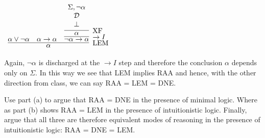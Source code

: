 \documentclass[11pt]{report}
\begin{document}
\begin{enumerate}
\begin{itemize}
		\begin{center}
			$\begin{array}{c}
				\infer[\LEM]{\alpha}
					{\alpha \lor \lnot \alpha
					&
					\alpha \to \alpha
					&
					\infer[\to I]{\lnot \alpha \to \alpha}
						{\infer[\XF]{\alpha}
							{\begin{array}{c} \Sigma, \lnot \alpha  \\ \mathcal{D} \\ \bot \end{array}}}}
			\end{array}$
		\end{center}

		Again, $\lnot \alpha$ is discharged at the $\to I$ step and therefore the conclusion $\alpha$ depends only on $\Sigma$. In this way we see that LEM implies RAA and hence, with the other direction from class, we can say RAA = LEM = DNE.

	\end{itemize}

	Use part (a) to argue that RAA = DNE in the presence of minimal logic. Where as part (b) shows RAA = LEM in the presence of intuitionistic logic. Finally, argue that all three are therefore equivalent modes of reasoning in the presence of intuitionistic logic: RAA = DNE = LEM.		

	\end{enumerate}	
\end{document}

